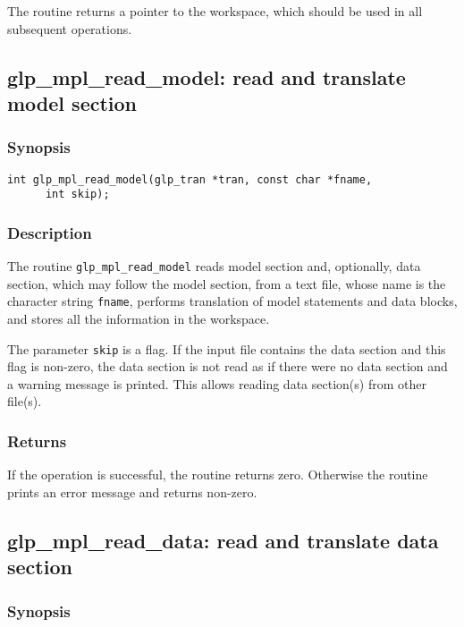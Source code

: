 The routine returns a pointer to the workspace, which should be used in
all subsequent operations.

\subsection{glp\_mpl\_read\_model: read and translate model section}

\subsubsection*{Synopsis}

\begin{verbatim}
int glp_mpl_read_model(glp_tran *tran, const char *fname,
      int skip);
\end{verbatim}

\subsubsection*{Description}

The routine \verb|glp_mpl_read_model| reads model section and,
optionally, data section, which may follow the model section, from a
text file, whose name is the character string \verb|fname|, performs
translation of model statements and data blocks, and stores all the
information in the workspace.

The parameter \verb|skip| is a flag. If the input file contains the
data section and this flag is non-zero, the data section is not read as
if there were no data section and a warning message is printed. This
allows reading data section(s) from other file(s).

\subsubsection*{Returns}

If the operation is successful, the routine returns zero. Otherwise
the routine prints an error message and returns non-zero.

\subsection{glp\_mpl\_read\_data: read and translate data section}

\subsubsection*{Synopsis}

